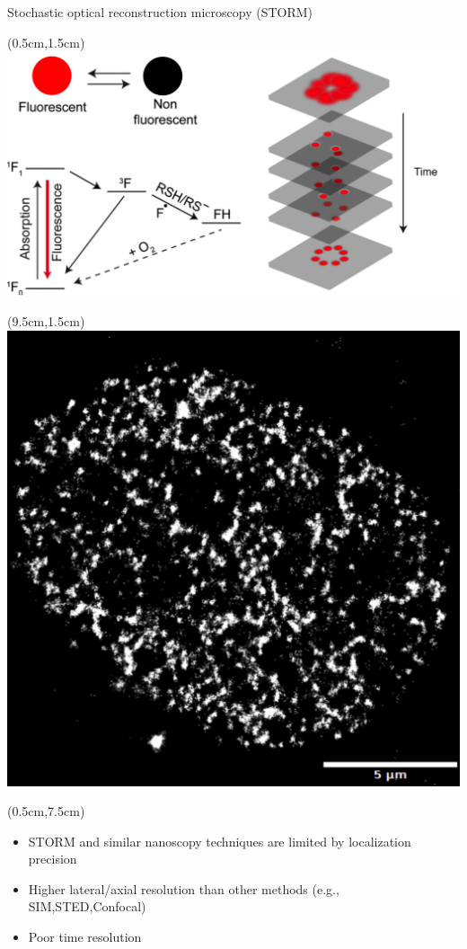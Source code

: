 \documentclass{beamer}					%
\begin{document}
\begin{frame}{Stochastic optical reconstruction microscopy (STORM)}
\begin{textblock*}{9cm}(0.5cm,1.5cm)
\includegraphics[width=\textwidth]{../../dissertation/dissertation/media/Intro-Cropped.png}
\end{textblock*}
\begin{textblock*}{5cm}(9.5cm,1.5cm)
\includegraphics[width=\textwidth]{../../dissertation/dissertation/media/STORM-Example.png}
\end{textblock*}
\begin{textblock*}{15cm}(0.5cm,7.5cm)
\begin{itemize}
\item STORM and similar nanoscopy techniques are limited by localization precision
\item Higher lateral/axial resolution than other methods (e.g., SIM,STED,Confocal)
\item Poor time resolution
\end{itemize}
\end{textblock*}
\end{frame}
\end{document}
